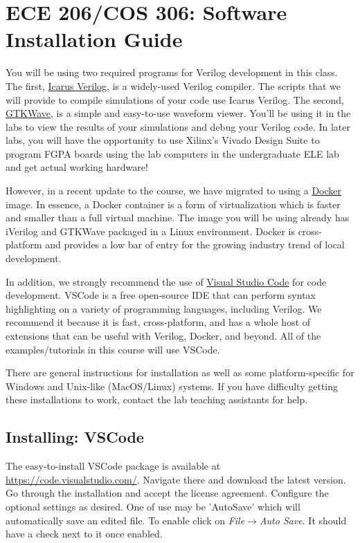 \documentclass[11pt, letterpaper, titlepage, oneside]{memoir}
\begin{document}
\mainmatter

\chapter*{ECE 206/COS 306: \newline Software Installation Guide}
	You will be using two required programs for Verilog development
	in this class. The first,
	\href{http://iverilog.icarus.com/}{Icarus Verilog}, is a widely-used
	Verilog compiler. The scripts that we will provide to compile simulations
	of your code use Icarus Verilog. The second,
	\href{http://gtkwave.sourceforge.net/}{GTKWave}, is a simple and
	easy-to-use waveform viewer. You'll be using it in the labs to view the
	results of your simulations and debug your Verilog code. 
	In later labs, you will have the opportunity to use
	Xilinx's Vivado Design Suite to program FGPA boards using the
	lab computers in the undergraduate ELE lab and get actual working hardware!
	
	However, in a recent update to the course, we have migrated to using a \href{https://www.docker.com/resources/what-container}{Docker} image. In essence, a Docker container is a form of virtualization which is faster and smaller than a full virtual machine. The image you will be using already has iVerilog and GTKWave packaged in a Linux environment. Docker is cross-platform and provides a low bar of entry for the growing industry trend of local development.

	In addition, we strongly recommend the use of
	\href{https://code.visualstudio.com/}{Visual Studio Code} for code
	development. VSCode is a free open-source IDE that can perform syntax
	highlighting on a variety of programming languages, including Verilog. We
	recommend it because it is fast, cross-platform, and has a whole host of extensions that can be useful with Verilog, Docker, and beyond.
	All of the examples/tutorials in this course will use VSCode.
    
	There are general instructions for installation as well as some platform-specific for Windows and Unix-like (MacOS/Linux) systems. If you have difficulty getting these installations to work, contact the lab teaching assistants for help.

    \section*{Installing: VSCode}
        The easy-to-install VSCode package is available at \url{https://code.visualstudio.com/}. Navigate there and download the latest version. Go through the installation and accept the license agreement. Configure the optional settings as desired. One of use may be 'AutoSave' which will automatically save an edited file. To enable click on \textit{File}$\rightarrow$\textit{Auto Save}. It should have a check next to it once enabled.
\end{document}
